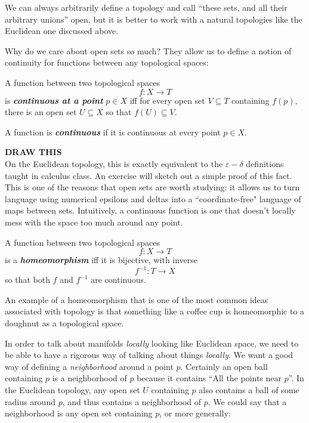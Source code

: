 \documentclass[../master.tex]{subfiles}
\begin{document}
	We can always arbitrarily define a topology and call ``these sets, and all their  arbitrary unions'' open, but it is better to work with a natural topologies like the Euclidean one discussed above.\\
	
	
	Why do we care about open sets so much? They allow us to define a notion of continuity for functions between any topological spaces:
	
	\begin{defn}[Continuity]\label{def:Continuity}
		A function between two topological spaces $$f: X \rightarrow T$$ is \textbf{\emph{continuous at a point}}  $p \in X$ iff for every open set $V\subseteq T$ containing $f(p)$, there is an open set $U \subseteq X$ so that $f(U) \subseteq V$.
		
		
		A function is \textbf{\emph{continuous}} if it is continuous at every point $p \in X$.
	\end{defn}
	\textbf{DRAW THIS}\\
	
	On the Euclidean topology, this is exactly equivalent to the $\varepsilon-\delta$ definitions taught in calculus class. An exercise will sketch out a simple proof of this fact. This is one of the reasons that open sets are worth studying: it allows us to turn language using numerical epsilons and deltas into a ``coordinate-free" language of maps between sets. Intuitively, a continuous function is one that doesn't locally mess with the space too much around any point. 
	
	\begin{defn}[Homeomorphism]\label{def:Homeomorphism}
		A function between two topological spaces $$f: X \rightarrow T$$ is a \textbf{\emph{homeomorphism}} iff it is bijective, with inverse $$f^{-1}: T \rightarrow X$$ so that both $f$ and $f^{-1}$ are continuous.
	\end{defn}
	
	An example of a homeomorphism that is one of the most common ideas associated with topology is that something like a coffee cup is homeomorphic to a doughnut as a topological space. \\
	
	In order to talk about manifolds \emph{locally} looking like Euclidean space, we need to be able to have a rigorous way of talking about things \emph{locally}. We want a good way of defining a \emph{neighborhood} around a point $p$. Certainly an open ball containing $p$ is a neighborhood of $p$ because it contains ``All the points near $p$''. In the Euclidean topology, any open set $U$ containing $p$ also contains a ball of some radius around $p$, and thus contains a neighborhood of $p$. We could say that a neighborhood is any open set containing $p$, or more generally:
	
\end{document}
